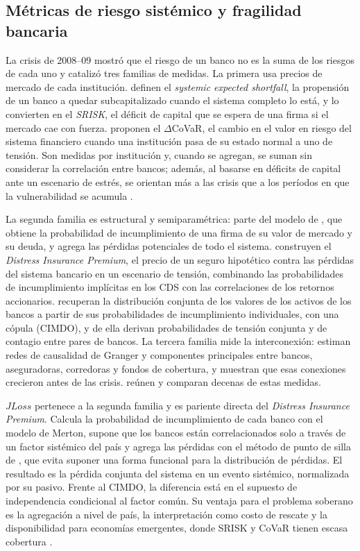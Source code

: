 \subsection{Métricas de riesgo sistémico y fragilidad bancaria}

La crisis de 2008--09 mostró que el riesgo de un banco no es la suma de los riesgos de cada uno y catalizó tres familias de medidas. La primera usa precios de mercado de cada institución. \citet{AcharyaEtAl2017b} definen el \textit{systemic expected shortfall}, la propensión de un banco a quedar subcapitalizado cuando el sistema completo lo está, y \citet{BrownleesEngle2016} lo convierten en el \textit{SRISK}, el déficit de capital que se espera de una firma si el mercado cae con fuerza. \citet{AdrianBrunnermeier2016b} proponen el $\Delta$CoVaR, el cambio en el valor en riesgo del sistema financiero cuando una institución pasa de su estado normal a uno de tensión. Son medidas por institución y, cuando se agregan, se suman sin considerar la correlación entre bancos; además, al basarse en déficits de capital ante un escenario de estrés, se orientan más a las crisis que a los períodos en que la vulnerabilidad se acumula \citep{Chari2024b}.

La segunda familia es estructural y semiparamétrica: parte del modelo de \citet{Merton1974b}, que obtiene la probabilidad de incumplimiento de una firma de su valor de mercado y su deuda, y agrega las pérdidas potenciales de todo el sistema. \citet{HuangZhouZhu2009} construyen el \textit{Distress Insurance Premium}, el precio de un seguro hipotético contra las pérdidas del sistema bancario en un escenario de tensión, combinando las probabilidades de incumplimiento implícitas en los CDS con las correlaciones de los retornos accionarios. \citet{SegovianoGoodhart2009} recuperan la distribución conjunta de los valores de los activos de los bancos a partir de sus probabilidades de incumplimiento individuales, con una cópula (CIMDO), y de ella derivan probabilidades de tensión conjunta y de contagio entre pares de bancos. La tercera familia mide la interconexión: \citet{BillioEtAl2012} estiman redes de causalidad de Granger y componentes principales entre bancos, aseguradoras, corredoras y fondos de cobertura, y muestran que esas conexiones crecieron antes de las crisis. \citet{BisiasEtAl2012} reúnen y comparan decenas de estas medidas.

$JLoss$ pertenece a la segunda familia y es pariente directa del \textit{Distress Insurance Premium}. Calcula la probabilidad de incumplimiento de cada banco con el modelo de Merton, supone que los bancos están correlacionados solo a través de un factor sistémico del país \citep{Vasicek1997} y agrega las pérdidas con el método de punto de silla de \citet{MartinThompsonBrowne2001}, que evita suponer una forma funcional para la distribución de pérdidas. El resultado es la pérdida conjunta del sistema en un evento sistémico, normalizada por su pasivo. Frente al CIMDO, la diferencia está en el supuesto de independencia condicional al factor común. Su ventaja para el problema soberano es la agregación a nivel de país, la interpretación como costo de rescate y la disponibilidad para economías emergentes, donde SRISK y CoVaR tienen escasa cobertura \citep{Chari2024b}.

